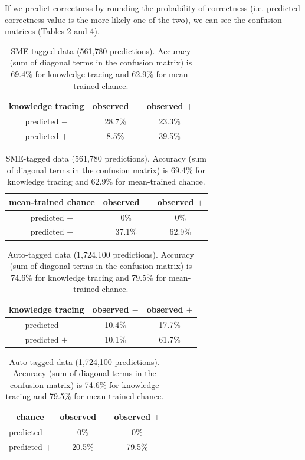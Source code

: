 \documentclass{sigchi}
\newcommand{\1}{\mathbf{1}}
\begin{document}
If we predict correctness by rounding the probability of correctness (i.e. predicted correctness value is the more likely one of the two), we can see the confusion matrices (Tables \ref{confsme} and \ref{confauto}).
\begin{table}[ht]
\caption{SME-tagged data (561,780 predictions). Accuracy (sum of diagonal terms in the confusion matrix) is 69.4\% for knowledge tracing and 62.9\% for mean-trained chance.}
\centering
\begin{tabular}{c c c}
\hline\hline
{\bf knowledge tracing} & observed $-$ & observed $+$\\ [0.5ex] %
\hline
predicted $-$ & 28.7\% & 23.3\% \\
predicted $+$ & 8.5\% & 39.5\% \\ [1ex]
\hline
\end{tabular}
\begin{tabular}{c c c}
\hline\hline
 {\bf mean-trained chance} & observed $-$ & observed $+$\\ [0.5ex] %
\hline
predicted $-$ & 0\% & 0\% \\
predicted $+$ & 37.1\% & 62.9\% \\ [1ex]
\hline
\end{tabular}
\label{confsme}
\end{table}
\begin{table}[ht]
\caption{Auto-tagged data (1,724,100 predictions). Accuracy (sum of diagonal terms in the confusion matrix) is 74.6\% for knowledge tracing and 79.5\% for mean-trained chance.}
\centering
\begin{tabular}{c c c}
\hline\hline
{\bf knowledge tracing} & observed $-$ & observed $+$\\ [0.5ex] %
\hline
predicted $-$ & 10.4\% & 17.7\% \\
predicted $+$ & 10.1\% & 61.7\% \\ [1ex]
\hline
\end{tabular}
\begin{tabular}{c c c}
\hline\hline
 {\bf chance} & observed $-$ & observed $+$\\ [0.5ex] %
\hline
predicted $-$ & 0\% & 0\% \\
predicted $+$ & 20.5\% & 79.5\% \\ [1ex]
\hline
\end{tabular}
\label{confauto}
\end{table}
\end{document}
